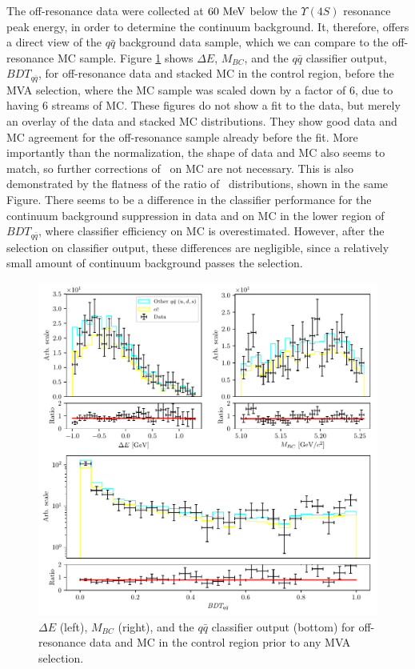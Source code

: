 The off-resonance data were collected at $60\mathrm{~MeV}$ below the $\Upsilon(4S)$ resonance peak energy, in order to determine the continuum background. It, therefore, offers a direct view of the $q\bar q$ background data sample, which we can compare to the off-resonance MC sample. Figure \ref{fig:offres_control} shows $\Delta E$, $M_{BC}$, and the $q \bar q$ classifier output, $BDT_{q\bar q}$, for off-resonance data and stacked MC in the control region, before the MVA selection, where the MC sample was scaled down by a factor of $6$, due to having 6 streams of MC. These figures do not show a fit to the data, but merely an overlay of the data and stacked MC distributions. They show good data and MC agreement for the off-resonance sample already before the fit. More importantly than the normalization, the shape of data and MC also seems to match, so further corrections of \vars~on MC are not necessary. This is also demonstrated by the flatness of the ratio of \vars~distributions, shown in the same Figure. There seems to be a difference in the classifier performance for the continuum background suppression in data and on MC in the lower region of $BDT_{q \bar q}$, where classifier efficiency on MC is overestimated. However, after the selection on classifier output, these differences are negligible, since a relatively small amount of continuum background passes the selection.
\begin{figure}[H]
	\centering
	\captionsetup{width=0.8\linewidth}
	\includegraphics[width=\linewidth]{fig/offres_control}
	\caption{$\Delta E$ (left), $M_{BC}$ (right), and the $q \bar q$ classifier output (bottom) for off-resonance data and MC in the control region prior to any MVA selection.}
	\label{fig:offres_control}
\end{figure}

